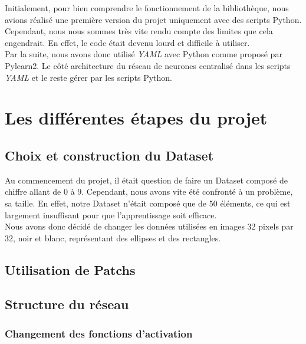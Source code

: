\documentclass[12pt, a4paper]{article}
\begin{document}
Initialement, pour bien comprendre le fonctionnement de la bibliothèque, nous avions réalisé une première version du projet uniquement avec des scripts Python. 
\\ Cependant, nous nous sommes très vite rendu compte des limites que cela engendrait. En effet, le code était devenu lourd et difficile à utiliser. 
\\

Par la suite, nous avons donc utilisé \emph{YAML} avec Python comme proposé par Pylearn2. Le côté architecture du réseau de neurones centralisé dans les scripts \emph{YAML} et le reste gérer par les scripts Python. 

\section{Les différentes étapes du projet}
	\subsection{Choix et construction du Dataset}
Au commencement du projet, il était question de faire un Dataset composé de chiffre allant de 0 à 9. 
Cependant, nous avons vite été confronté à un problème, sa taille. En effet, notre Dataset n'était composé que de 50 éléments, ce qui est largement insuffisant pour que l'apprentissage soit efficace.
\\ Nous avons donc décidé de changer les données utilisées en images 32 pixels par 32, noir et blanc, représentant des ellipses et des rectangles.
 
	\subsection{Utilisation de Patchs}
	\subsection{Structure du réseau}
	\subsubsection{Changement des fonctions d'activation}
\end{document}
